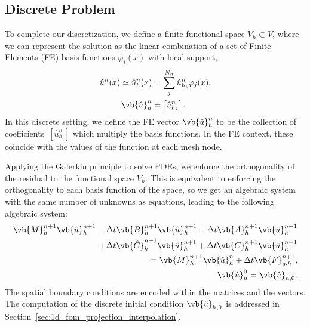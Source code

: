 \documentclass[../main.tex]{subfiles}
\begin{document}
\subsection{Discrete Problem}
To complete our discretization, we define a finite functional space $V_h \subset V$, where we can represent the solution as the linear combination of a set of Finite Elements (FE) basis functions $\varphi_i(x)$ with local support,
\begin{align}
    \hat{u}^{n}(x) \simeq \hat{u}_h^n(x) &= \sum_j^{N_h} \hat{u}_{h_i}^n \varphi_j(x), \\
    \vb{\hat{u}}_h^{n} &= \left[\hat{u}_{h_i}^n\right].
\end{align}
In this discrete setting, we define the FE vector $\vb{\hat{u}}_h^{n}$ to be the collection of coefficients~$[\hat{u}_{h_i}^n]$ which multiply the basis functions.
In the FE context, these coincide with the values of the function at each mesh node.

Applying the Galerkin principle to solve PDEs, we enforce the orthogonality of the residual to the functional space $V_h$. 
This is equivalent to enforcing the orthogonality to each basis function of the space, so we get an algebraic system with the same number of unknowns as equations, leading to the following algebraic system:
\begin{subequations}
    \begin{align}
        \label{eq:1d_fom_weak_formulation_discrete}
        \vb{M}^{n+1}_h \vb{\hat{u}}_{h}^{n+1} 
        - \Delta t \vb{B}^{n+1}_h \vb{\hat{u}}_{h}^{n+1} 
        + \Delta t \vb{A}^{n+1}_h \vb{\hat{u}}_{h}^{n+1} \nonumber \\ 
        + \Delta t \vb{\hat{C}}^{n+1}_h \vb{\hat{u}}_{h}^{n+1} 
        + \Delta t \vb{C}^{n+1}_h \vb{\hat{u}}_{h}^{n+1} \\ 
        = \vb{M}^{n+1}_h \vb{\hat{u}}_{h}^{n}
        + \Delta t \vb{F}_{g,h}^{n+1}, \nonumber \\
        \vb{\hat{u}}_h^{0} = \vb{\hat{u}}_{h,0}.
    \end{align}
\end{subequations}
The spatial boundary conditions are encoded within the matrices and the vectors. 
The computation of the discrete initial condition $\vb{\hat{u}}_{h,0}$ is addressed in Section~\ref{sec:1d_fom_projection_interpolation}.
\end{document}
